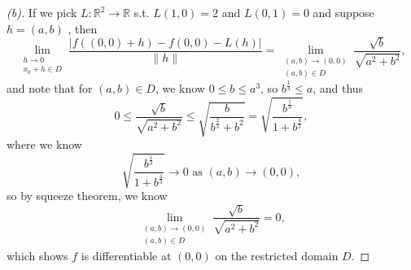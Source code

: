 \begin{proof}[(b)]
    If we pick \(L: \mathbb{R} ^2 \to \mathbb{R} \) s.t. \(L(1, 0) = 2\) and \(L(0, 1) = 0\) and suppose \(h = (a, b)\) , then 
    \[
        \lim_{\substack{h \to 0 \\ x_0 + h \in D}} \frac{\left\vert f((0, 0) + h) - f(0, 0) - L(h) \right\vert }{\lVert h \rVert } = \lim_{\substack{(a, b) \to (0, 0) \\ (a, b) \in D}} \frac{\sqrt{b} }{\sqrt{a^2 + b^2} },
    \]  
    and note that for \((a, b) \in D\), we know \(0 \le b \le a^3\), so \(b^{\frac{1}{3}} \le a\), and thus 
    \[
        0 \le \frac{\sqrt{b} }{\sqrt{a^2 + b^2} } \le \sqrt{\frac{b}{b^{\frac{2}{3}} + b^2}} = \sqrt{\frac{b^{\frac{1}{3}}}{1 + b^{\frac{4}{3}}}},  
    \]   
    where we know 
    \[
        \sqrt{\frac{b^{\frac{1}{3}}}{1 + b^{\frac{4}{3}}}} \to 0 \text{ as } (a, b) \to (0, 0), 
    \]
    so by squeeze theorem, we know 
    \[
        \lim_{\substack{(a, b) \to (0, 0) \\ (a, b) \in D}} \frac{\sqrt{b} }{\sqrt{a^2 + b^2} } = 0,
    \]
    which shows \(f\) is differentiable at \((0, 0)\) on the restricted domain \(D\).   
\end{proof}

